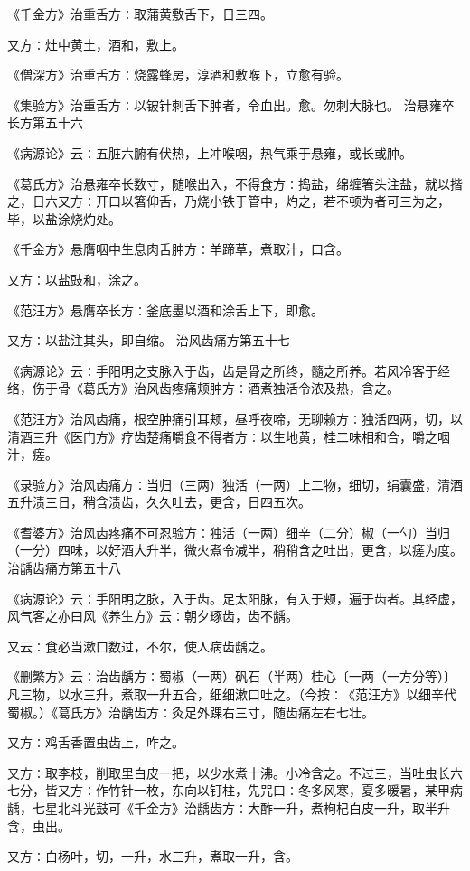 \documentclass[a4paper,12pt,UTF8,twoside]{ctexbook}
\begin{document}
《千金方》治重舌方∶取蒲黄敷舌下，日三四。

又方∶灶中黄土，酒和，敷上。

《僧深方》治重舌方∶烧露蜂房，淳酒和敷喉下，立愈有验。

《集验方》治重舌方∶以铍针刺舌下肿者，令血出。愈。勿刺大脉也。
治悬雍卒长方第五十六

《病源论》云∶五脏六腑有伏热，上冲喉咽，热气乘于悬雍，或长或肿。

《葛氏方》治悬雍卒长数寸，随喉出入，不得食方∶捣盐，绵缠箸头注盐，就以揩之，日六又方∶开口以箸仰舌，乃烧小铁于管中，灼之，若不顿为者可三为之，毕，以盐涂烧灼处。

《千金方》悬膺咽中生息肉舌肿方∶羊蹄草，煮取汁，口含。

又方∶以盐豉和，涂之。

《范汪方》悬膺卒长方∶釜底墨以酒和涂舌上下，即愈。

又方∶以盐注其头，即自缩。
治风齿痛方第五十七

《病源论》云∶手阳明之支脉入于齿，齿是骨之所终，髓之所养。若风冷客于经络，伤于骨《葛氏方》治风齿疼痛颊肿方∶酒煮独活令浓及热，含之。

《范汪方》治风齿痛，根空肿痛引耳颊，昼呼夜啼，无聊赖方∶独活四两，切，以清酒三升《医门方》疗齿楚痛嚼食不得者方∶以生地黄，桂二味相和合，嚼之咽汁，瘥。

《录验方》治风齿痛方∶当归（三两）独活（一两）上二物，细切，绢囊盛，清酒五升渍三日，稍含渍齿，久久吐去，更含，日四五次。

《耆婆方》治风齿疼痛不可忍验方∶独活（一两）细辛（二分）椒（一勺）当归（一分）四味，以好酒大升半，微火煮令减半，稍稍含之吐出，更含，以瘥为度。
治龋齿痛方第五十八

《病源论》云∶手阳明之脉，入于齿。足太阳脉，有入于颊，遍于齿者。其经虚，风气客之亦曰风《养生方》云∶朝夕琢齿，齿不龋。

又云∶食必当漱口数过，不尔，使人病齿龋之。

《删繁方》云∶治齿龋方∶蜀椒（一两）矾石（半两）桂心〔一两（一方分等）〕凡三物，以水三升，煮取一升五合，细细漱口吐之。（今按∶《范汪方》以细辛代蜀椒。）《葛氏方》治龋齿方∶灸足外踝右三寸，随齿痛左右七壮。

又方∶鸡舌香置虫齿上，咋之。

又方∶取李枝，削取里白皮一把，以少水煮十沸。小冷含之。不过三，当吐虫长六七分，皆又方∶作竹针一枚，东向以钉柱，先咒曰∶冬多风寒，夏多暖暑，某甲病龋，七星北斗光鼓可《千金方》治龋齿方∶大酢一升，煮枸杞白皮一升，取半升含，虫出。

又方∶白杨叶，切，一升，水三升，煮取一升，含。
\end{document}
